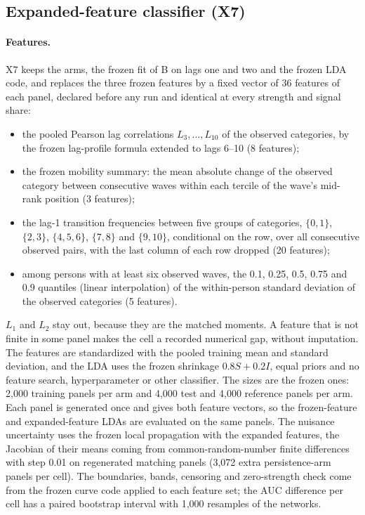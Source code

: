 





\clearpage

\subsection{Expanded-feature classifier (X7)}\label{sec:x7}

\paragraph{Features.}\label{sec:x7-features}
X7 keeps the arms, the frozen fit of B on lags one and two and the frozen LDA code, and replaces the three frozen features by a fixed vector of 36 features of each panel, declared before any run and identical at every strength and signal share:
\begin{itemize}
\item the pooled Pearson lag correlations $L_3,\ldots,L_{10}$ of the observed categories, by the frozen lag-profile formula extended to lags 6--10 (8 features);
\item the frozen mobility summary: the mean absolute change of the observed category between consecutive waves within each tercile of the wave's mid-rank position (3 features);
\item the lag-1 transition frequencies between five groups of categories, $\{0,1\}$, $\{2,3\}$, $\{4,5,6\}$, $\{7,8\}$ and $\{9,10\}$, conditional on the row, over all consecutive observed pairs, with the last column of each row dropped (20 features);
\item among persons with at least six observed waves, the 0.1, 0.25, 0.5, 0.75 and 0.9 quantiles (linear interpolation) of the within-person standard deviation of the observed categories (5 features).
\end{itemize}
$L_1$ and $L_2$ stay out, because they are the matched moments. A feature that is not finite in some panel makes the cell a recorded numerical gap, without imputation. The features are standardized with the pooled training mean and standard deviation, and the LDA uses the frozen shrinkage $0.8S+0.2I$, equal priors and no feature search, hyperparameter or other classifier. The sizes are the frozen ones: 2,000 training panels per arm and 4,000 test and 4,000 reference panels per arm. Each panel is generated once and gives both feature vectors, so the frozen-feature and expanded-feature LDAs are evaluated on the same panels. The nuisance uncertainty uses the frozen local propagation with the expanded features, the Jacobian of their means coming from common-random-number finite differences with step 0.01 on regenerated matching panels (3,072 extra persistence-arm panels per cell). The boundaries, bands, censoring and zero-strength check come from the frozen curve code applied to each feature set; the AUC difference per cell has a paired bootstrap interval with 1,000 resamples of the networks.

